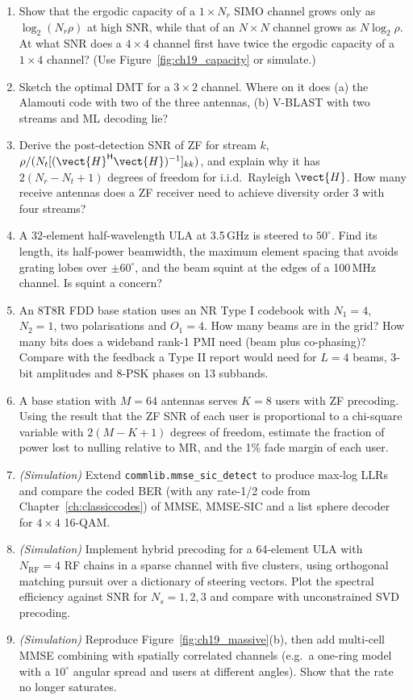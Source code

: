 \begin{enumerate}[label=\thechapter.\arabic*]
\item Show that the ergodic capacity of a $1\times N_r$ SIMO channel grows only as $\log_2(N_r\rho)$
at high SNR, while that of an $N\times N$ channel grows as $N\log_2\rho$. At what SNR does a $4\times4$
channel first have twice the ergodic capacity of a $1\times4$ channel? (Use Figure~\ref{fig:ch19_capacity}
or simulate.)
\item Sketch the optimal DMT for a $3\times2$ channel. Where on it does (a) the Alamouti code with two of
the three antennas, (b) V-BLAST with two streams and ML decoding lie?
\item Derive the post-detection SNR of ZF for stream $k$, $\rho/(N_t[(\vect{H}^{\mathsf H}\vect{H})^{-1}]_{kk})$,
and explain why it has $2(N_r-N_t+1)$ degrees of freedom for i.i.d.\ Rayleigh $\vect{H}$. How many
receive antennas does a ZF receiver need to achieve diversity order 3 with four streams?
\item A 32-element half-wavelength ULA at 3.5\,GHz is steered to $50^\circ$. Find its length, its
half-power beamwidth, the maximum element spacing that avoids grating lobes over $\pm60^\circ$, and the
beam squint at the edges of a 100\,MHz channel. Is squint a concern?
\item An 8T8R FDD base station uses an NR Type I codebook with $N_1=4$, $N_2=1$, two polarisations and
$O_1=4$. How many beams are in the grid? How many bits does a wideband rank-1 PMI need (beam plus
co-phasing)? Compare with the feedback a Type II report would need for $L=4$ beams, 3-bit amplitudes and
8-PSK phases on 13 subbands.
\item A base station with $M=64$ antennas serves $K=8$ users with ZF precoding. Using the result that
the ZF SNR of each user is proportional to a chi-square variable with $2(M-K+1)$ degrees of freedom,
estimate the fraction of power lost to nulling relative to MR, and the 1\% fade margin of each user.
\item \emph{(Simulation)} Extend \texttt{commlib.mmse\_sic\_detect} to produce max-log LLRs and compare
the coded BER (with any rate-1/2 code from Chapter~\ref{ch:classiccodes}) of MMSE, MMSE-SIC and a list
sphere decoder for $4\times4$ 16-QAM.
\item \emph{(Simulation)} Implement hybrid precoding for a 64-element ULA with $N_{\text{RF}}=4$ RF
chains in a sparse channel with five clusters, using orthogonal matching pursuit over a dictionary of
steering vectors. Plot the spectral efficiency against SNR for $N_s=1,2,3$ and compare with
unconstrained SVD precoding.
\item \emph{(Simulation)} Reproduce Figure~\ref{fig:ch19_massive}(b), then add multi-cell MMSE
combining with spatially correlated channels (e.g.\ a one-ring model with a $10^\circ$ angular spread
and users at different angles). Show that the rate no longer saturates.
\end{enumerate}

